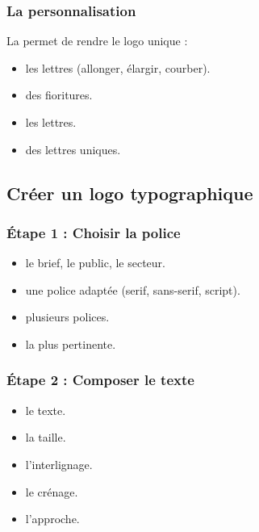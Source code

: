 \subsubsection{La personnalisation}

La  permet de rendre le logo unique :

\begin{itemize}
    \item {} les lettres (allonger, élargir, courber).
    \item {} des fioritures.
    \item {} les lettres.
    \item {} des lettres uniques.
\end{itemize}

\subsection{Créer un logo typographique}

\subsubsection{Étape 1 : Choisir la police}

\begin{itemize}
    \item {} le brief, le public, le secteur.
    \item {} une police adaptée (serif, sans-serif, script).
    \item {} plusieurs polices.
    \item {} la plus pertinente.
\end{itemize}

\subsubsection{Étape 2 : Composer le texte}

\begin{itemize}
    \item {} le texte.
    \item {} la taille.
    \item {} l'interlignage.
    \item {} le crénage.
    \item {} l'approche.
\end{itemize}


